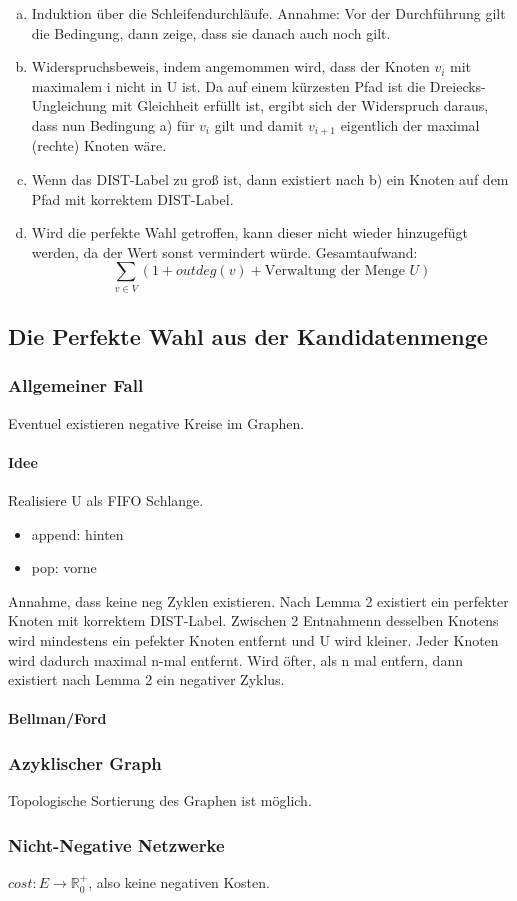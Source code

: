 \begin{enumerate}[a)]
    \item Induktion über die Schleifendurchläufe. Annahme: Vor der Durchführung gilt die Bedingung, dann zeige, dass sie danach auch noch gilt. 
    \item Widerspruchsbeweis, indem angemommen wird, dass der Knoten $v_i$ mit maximalem i nicht in U ist. Da auf einem kürzesten Pfad ist die Dreiecks-Ungleichung mit Gleichheit erfüllt ist, ergibt sich der Widerspruch daraus, dass nun Bedingung a) für $v_i$ gilt und damit $v_{i+1}$ eigentlich der maximal (rechte) Knoten wäre.
    \item Wenn das DIST-Label zu groß ist, dann existiert nach b) ein Knoten auf dem Pfad mit korrektem DIST-Label.
    \item Wird die perfekte Wahl getroffen, kann dieser nicht wieder hinzugefügt werden, da der Wert sonst vermindert würde. Gesamtaufwand: $$ \sum_{v\in V} ( 1+ outdeg(v) + \text{Verwaltung der Menge }U) $$
\end{enumerate}

\subsection{Die Perfekte Wahl aus der Kandidatenmenge}
\subsubsection{Allgemeiner Fall}
Eventuel existieren negative Kreise im Graphen. 
\paragraph{Idee} Realisiere U als FIFO Schlange.
\begin{itemize}
    \item append: hinten
    \item pop: vorne
\end{itemize}
Annahme, dass keine neg Zyklen existieren. Nach Lemma 2 existiert ein perfekter Knoten mit korrektem DIST-Label. Zwischen 2 Entnahmenn desselben Knotens wird mindestens ein pefekter Knoten entfernt und U wird kleiner. Jeder Knoten wird dadurch maximal n-mal entfernt. Wird öfter, als n mal entfern, dann existiert nach Lemma 2 ein negativer Zyklus.

\paragraph{Bellman/Ford}


\subsubsection{Azyklischer Graph}
Topologische Sortierung des Graphen ist möglich. 


\subsubsection{Nicht-Negative Netzwerke}
$cost: E \rightarrow  \mathbb{R}^+_0$, also keine negativen Kosten.


